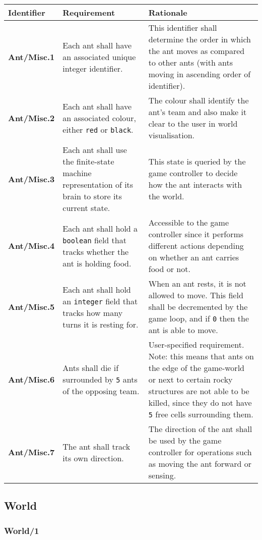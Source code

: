 \documentclass[11pt]{article}
\begin{document}
\begin{longtable}[c]{|p{}|p{}|p{}|}
\hline
Identifier & Requirement & Rationale\tabularnewline
\hline

\textbf{Ant/Misc.1} & Each ant shall have an associated unique integer
identifier. & This identifier shall determine the order in which the ant
moves as compared to other ants (with ants moving in ascending order of
identifier).\tabularnewline
\textbf{Ant/Misc.2} & Each ant shall have an associated colour, either
\texttt{red} or \texttt{black}. & The colour shall identify the ant's
team and also make it clear to the user in world
visualisation.\tabularnewline
\textbf{Ant/Misc.3} & Each ant shall use the finite-state machine
representation of its brain to store its current state. & This state is
queried by the game controller to decide how the ant interacts with the
world.\tabularnewline
\textbf{Ant/Misc.4} & Each ant shall hold a \texttt{boolean} field that
tracks whether the ant is holding food. & Accessible to the game
controller since it performs different actions depending on whether an
ant carries food or not.\tabularnewline
\textbf{Ant/Misc.5} & Each ant shall hold an \texttt{integer} field that
tracks how many turns it is resting for. & When an ant rests, it is not
allowed to move. This field shall be decremented by the game loop, and
if \texttt{0} then the ant is able to move.\tabularnewline
\textbf{Ant/Misc.6} & Ants shall die if surrounded by \texttt{5} ants of
the opposing team. & User-specified requirement. Note: this means that
ants on the edge of the game-world or next to certain rocky structures
are not able to be killed, since they do not have \texttt{5} free cells
surrounding them.\tabularnewline
\textbf{Ant/Misc.7} & The ant shall track its own direction. & The
direction of the ant shall be used by the game controller for operations
such as moving the ant forward or sensing.\tabularnewline
\hline
\end{longtable}

\subsection{World}\label{world}

\subsubsection*{World/1}\label{world1}
\end{document}
